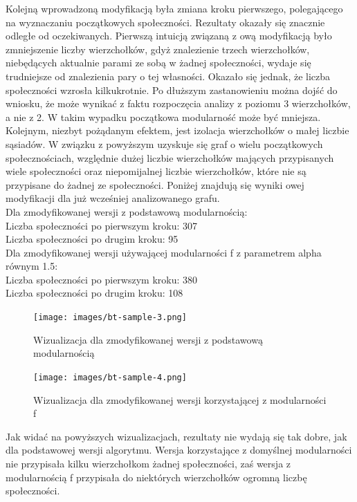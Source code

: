 \documentclass{article}
\begin{document}
Kolejną wprowadzoną modyfikacją była zmiana kroku pierwszego, polegającego na wyznaczaniu początkowych społeczności. Rezultaty okazały się znacznie odległe od oczekiwanych. Pierwszą intuicją związaną z ową modyfikacją było zmniejszenie liczby wierzchołków, gdyż znalezienie trzech wierzchołków, niebędących aktualnie parami ze sobą w żadnej społeczności, wydaje się trudniejsze od znalezienia pary o tej własności. Okazało się jednak, że liczba społeczności wzrosła kilkukrotnie. Po dłuższym zastanowieniu można dojść do wniosku, że może wynikać z faktu rozpoczęcia analizy z poziomu 3 wierzchołków, a nie z 2. W takim wypadku początkowa modularność może być mniejsza. Kolejnym, niezbyt pożądanym efektem, jest izolacja wierzchołków o małej liczbie sąsiadów. W związku z powyższym uzyskuje się graf o wielu początkowych społecznościach, względnie dużej liczbie wierzchołków mających przypisanych wiele społeczności oraz niepomijalnej liczbie wierzchołków, które nie są przypisane do żadnej ze społeczności. Poniżej znajdują się wyniki owej modyfikacji dla już wcześniej analizowanego grafu.\\
Dla zmodyfikowanej wersji z podstawową modularnością:\\
Liczba społeczności po pierwszym kroku: 307\\
Liczba społeczności po drugim kroku: 95\\
Dla zmodyfikowanej wersji używającej modularności f z parametrem alpha równym 1.5:\\
Liczba społeczności po pierwszym kroku: 380\\
Liczba społeczności po drugim kroku: 108\\


\begin{figure}[H]
\centering
\texttt{[image: images/bt-sample-3.png]}
\caption{Wizualizacja dla zmodyfikowanej wersji z podstawową modularnością}
\end{figure}

\begin{figure}[H]
\centering
\texttt{[image: images/bt-sample-4.png]}
\caption{Wizualizacja dla zmodyfikowanej wersji korzystającej z modularności f}
\end{figure}

Jak widać na powyższych wizualizacjach, rezultaty nie wydają się tak dobre, jak dla podstawowej wersji algorytmu. Wersja korzystające z domyślnej modularności nie przypisała kilku wierzchołkom żadnej społeczności, zaś wersja z modularnością f  przypisała do niektórych wierzchołków ogromną liczbę społeczności.\\
\end{document}
